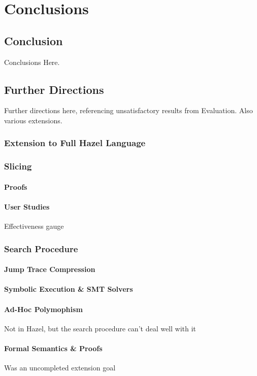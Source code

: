 \chapter{Conclusions}

\section{Conclusion}
Conclusions Here.

\section{Further Directions}
Further directions here, referencing unsatisfactory results from Evaluation. Also various extensions.
\subsection{Extension to Full Hazel Language}

\subsection{Slicing}
\subsubsection{Proofs}
\subsubsection{User Studies}
Effectiveness gauge

\subsection{Search Procedure}
\subsubsection{Jump Trace Compression}
\subsubsection{Symbolic Execution \& SMT Solvers}
\subsubsection{Ad-Hoc Polymophism}
Not in Hazel, but the search procedure can't deal well with it
\subsubsection{Formal Semantics \& Proofs}
Was an uncompleted extension goal

